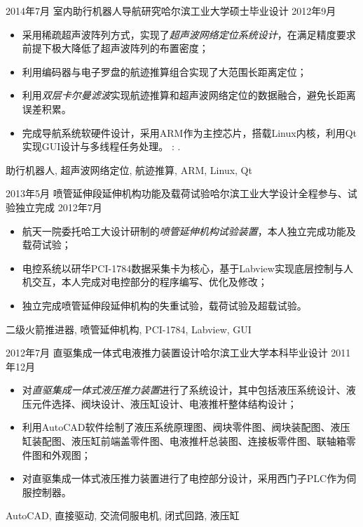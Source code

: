 \begin{experiences}
	\emptySeparator
	\experience
	{2014年7月} {室内助行机器人导航研究}{哈尔滨工业大学}{硕士毕业设计}
	{2012年9月}    {
	   	\begin{itemize}
	   		\item 采用稀疏超声波阵列方式，实现了\emph{超声波网络定位系统设计}，在满足精度要求前提下极大降低了超声波阵列的布置密度；
	   		\item 利用编码器与电子罗盘的航迹推算组合实现了大范围长距离定位；
	   		\item 利用\emph{双层卡尔曼滤波}实现航迹推算和超声波网络定位的数据融合，避免长距离误差积累。
	   		\item 完成导航系统软硬件设计，采用ARM作为主控芯片，搭载Linux内核，利用Qt实现GUI设计与多线程任务处理。 \faGithub: .	 		
	   		
	   	\end{itemize}
	}
	{助行机器人, 超声波网络定位, 航迹推算, ARM, Linux, Qt}
	
	\emptySeparator
	\experience
	{2013年5月} {喷管延伸段延伸机构功能及载荷试验}{哈尔滨工业大学}{设计全程参与、试验独立完成}
	{2012年7月}    {
		\begin{itemize}
			\item 航天一院委托哈工大设计研制的\emph{喷管延伸机构试验装置}，本人独立完成功能及载荷试验；
			\item 电控系统以研华PCI-1784数据采集卡为核心，基于Labview实现底层控制与人机交互，本人完成对电控部分的程序编写、优化及修改；
			\item 独立完成喷管延伸段延伸机构的失重试验，载荷试验及超载试验。
		\end{itemize}
	}
	{二级火箭推进器, 喷管延伸机构, PCI-1784, Labview, GUI}

	\emptySeparator
	\experience
	{2012年7月} {直驱集成一体式电液推力装置设计}{哈尔滨工业大学}{本科毕业设计}
	{2011年12月}    {
	 	\begin{itemize}
	 		\item 对\emph{直驱集成一体式液压推力装置}进行了系统设计，其中包括液压系统设计、液压元件选择、阀块设计、液压缸设计、电液推杆整体结构设计；
	 		\item 利用AutoCAD软件绘制了液压系统原理图、阀块零件图、阀块装配图、液压缸装配图、液压缸前端盖零件图、电液推杆总装图、连接板零件图、联轴箱零件图和外观图；
	 		\item 对直驱集成一体式液压推力装置进行了电控部分设计，采用西门子PLC作为伺服控制器。
	 	\end{itemize}
	}
	{AutoCAD, 直接驱动, 交流伺服电机, 闭式回路, 液压缸}
		
\end{experiences}
